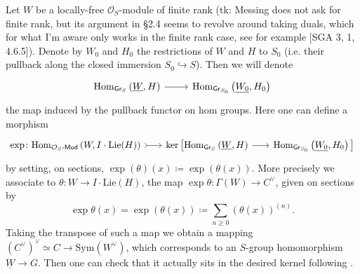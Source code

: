 \documentclass[../Main]{subfiles}
\begin{document}
\begin{defn}
	Let $W$ be a locally-free $\mathcal{O}_{ S }$-module of finite rank
	(tk: Messing does not ask for finite rank, but its argument in \S2.4
	seems to revolve around taking duals, which for what I'm aware
	only works in the finite rank case, see for example [SGA 3, 1, 4.6.5]).
	Denote by $W_0$ and $H_0$ the restrictions of $W$ and $H$ to 
	$S_0$ (i.e. their pullback along
	the closed immersion $S_0 \hookrightarrow S$).
	Then we will denote
	\begin{equation*}
	\begin{tikzcd}[row sep = 0ex
		,/tikz/column 1/.append style={anchor=base east}
		,/tikz/column 2/.append style={anchor=base west}]
		\mathrm{Hom}_{ \mathsf{Gr}_S } 
		\left( \underline{W}, H \right)
		\arrow[r, "", rightarrow] &
		\mathrm{Hom}_{ \mathsf{Gr}_{S_0} }
		\left( \underline{W_0}, H_0 \right)
	\end{tikzcd}
	\end{equation*} 
	the map induced by the pullback functor on hom groups.
	Here one can define a morphism
	\begin{equation*}
	\begin{tikzcd}[row sep = 0ex, column sep = 1.8em
		,/tikz/column 1/.append style={anchor=base east}
		,/tikz/column 2/.append style={anchor=base west}]
		\exp\colon
		\mathrm{Hom}_{ \mathcal{O}_{ S }\text{-}\mathsf{Mod} }
		\left( W, I \cdot \mathrm{Lie}(H) \right)
		\arrow[r, "", rightarrowtail] &
		\ker \big[ 
		\mathrm{Hom}_{ \mathsf{Gr}_S } 
		\left( \underline{W}, H \right)
		\arrow[r, "", rightarrow] &
		\mathrm{Hom}_{ \mathsf{Gr}_{S_0} }
		\left( \underline{W_0}, H_0 \right)
		\big]
	\end{tikzcd}
	\end{equation*} 
	by setting, on sections,
	$\exp (\theta) (x) \coloneqq \exp \left( \theta(x) \right)$.
	More precisely we associate to $\theta\colon W \to I \cdot \mathrm{Lie}(H)$,
	the map $\exp \theta\colon \Gamma(W) \to C^\vee$, given on sections by
	\begin{equation*}
	\exp \theta (x) =
	\exp \left( \theta(x) \right) \coloneqq
	\sum_{n\geq 0 } (\theta(x))^{(n)}
	.\end{equation*}
	Taking the transpose of such a map we obtain a mapping 
	$(C^\vee)^\vee \simeq C \to \mathrm{Sym}(W^\vee)$, which corresponds
	to an $S$-group homomorphism $\underline{W} \to G$.
	Then one can check that it actually sits in the desired kernel
	following \cite[Chapter III, \S2.4, 2.6]{Messing}.
\end{defn}
\end{document}
